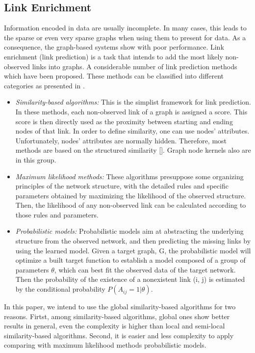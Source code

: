 \documentclass[runningheads,a4paper]{llncs}
\begin{document}
\subsection{Link Enrichment}
\label{link-enrichment}
Information encoded in data are usually incomplete. In many cases, this leads to the sparse or even very sparse graphs when using them to present for data. As a consequence, the graph-based systems show with poor performance. Link enrichment (link prediction) is a task that intends to add the most likely non-observed links into graphs. A considerable number of link prediction methods which have been proposed. These methods can be classified into different categories as presented in \cite{?}. 
\begin{itemize}
\item \textit{Similarity-based algorithms:} This is the simplist framework for link prediction. In these methods, each non-observed link of a graph is assigned a score. This score is then directly used as the proximity between starting and ending nodes of that link. In order to define similarity, one can use nodes' attributes. Unfortunately, nodes' attributes are normally hidden. Therefore, most methods are based on the structured similarity [\cite{reference here}]. Graph node kernels also are in this group.

\item \textit{Maximum likelihood methods:} These algorithms presuppose some organizing principles of the network structure, with the detailed rules and specific parameters obtained by maximizing the likelihood of the observed structure. Then, the likelihood of any non-observed link can be calculated according to
those rules and parameters.

\item \textit{Probabilistic models:} Probabilistic models aim at abstracting the underlying structure from the observed network, and then predicting the missing links by using the learned model. Given a target graph, G, the probabilistic model will optimize a built target function to establish a model composed of a group of parameters $\theta$, which can best fit the observed data of the target network. Then the probability of the existence of a nonexistent link (i, j) is estimated by the conditional probability $P(A_{ij} = 1|\theta)$.

\end{itemize}
In this paper, we intend to use the global similarity-based algorithms for two reasons. Firtst, among similarity-based algorithms, global ones show better results in general, even the complexity is higher than local and semi-local similarity-based algorithms. Second, it is easier and less complexity to apply comparing with maximum likelihood methods probabilistic models.
\end{document}
